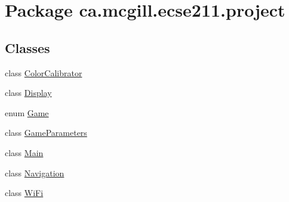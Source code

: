 \hypertarget{namespaceca_1_1mcgill_1_1ecse211_1_1project}{}\section{Package ca.\+mcgill.\+ecse211.\+project}
\label{namespaceca_1_1mcgill_1_1ecse211_1_1project}
\subsection*{Classes}
\begin{DoxyCompactItemize}
\item 
class \hyperlink{classca_1_1mcgill_1_1ecse211_1_1project_1_1_color_calibrator}{Color\+Calibrator}
\item 
class \hyperlink{classca_1_1mcgill_1_1ecse211_1_1project_1_1_display}{Display}
\item 
enum \hyperlink{enumca_1_1mcgill_1_1ecse211_1_1project_1_1_game}{Game}
\item 
class \hyperlink{classca_1_1mcgill_1_1ecse211_1_1project_1_1_game_parameters}{Game\+Parameters}
\item 
class \hyperlink{classca_1_1mcgill_1_1ecse211_1_1project_1_1_main}{Main}
\item 
class \hyperlink{classca_1_1mcgill_1_1ecse211_1_1project_1_1_navigation}{Navigation}
\item 
class \hyperlink{classca_1_1mcgill_1_1ecse211_1_1project_1_1_wi_fi}{Wi\+Fi}
\end{DoxyCompactItemize}

